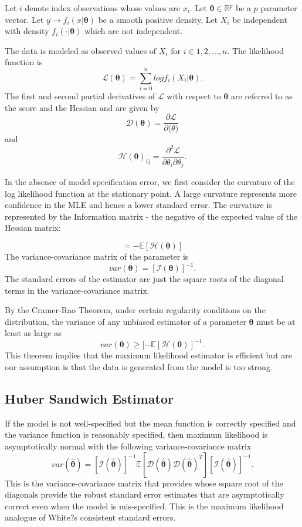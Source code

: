 \documentclass{article}
\newcommand{\be}{\begin{equation}}
\newcommand{\ee}{\end{equation}}
\begin{document}
Let $i$ denote index observations whose values are $x_i$. Let $\mathbf{\theta}\in\mathbb{R}^p$
be a $p$ parameter vector. Let $y\rightarrow f_i(x|\mathbf{\theta})$ be a smooth positive density. Let $X_i$ be independent with density $f_i(\cdot|\mathbf{\theta})$ which are not independent.  

The data is modeled as observed values of $X_i$ for $i\in1,2,\dots,n$. The likelihood function is
\be
\mathcal{L}(\mathbf{\theta})=\sum_{i=0}^n log f_i(X_i | \mathbf{\theta}).
\ee
The first and second partial derivatives of
$\mathcal{L}$
with respect to $\mathbf{\theta}$ are referred to as the score and the Hessian and
are given by
\be
\mathcal{D}(\mathbf{\theta})=\frac{\partial \mathcal{L}}{\partial \mathbf(\theta)}
\ee
and
\be
\mathcal{H}(\mathbf{\theta})_{ij}=\frac{\partial^2 \mathcal{L}}{\partial\theta_i \partial\theta_j}.
\ee




In the absence of model specification error, we first consider the curvature of the log likelihood function at the stationary point. A large curvature represents more confidence in the MLE and hence a lower standard error.  The curvature is represented by the Information matrix - the negative of the
expected value of the Hessian matrix:

\be
[\mathcal{I}(\mathbf{\theta}))] = - \mathbb{E}[\mathcal{H}(\mathbf{\theta})]
\ee
The variance-covariance matrix of the parameter is
 \be
var(\mathbf{\theta}) =  [\mathcal{I}(\mathbf{\theta})]^{-1}.
\ee
The standard errors of the estimator are just the square roots of the
diagonal terms in the variance-covariance matrix.

By the Cramer-Rao Theorem, under certain regularity conditions on the distribution, the variance of any unbiased estimator of a parameter $\mathbf{\theta}$ must be at least as large as
\be
var(\mathbf{\theta})\geq [-\mathbb{E}[\mathcal{H}(\mathbf{\theta})]^{-1}.
\ee
This theorem implies that the maximum likelihood estimator is efficient but are our assumption is that the data is generated from the model is too strong.


\subsection{Huber Sandwich Estimator}

If the model is not well-specified but the mean function is correctly specified and the variance
function is reasonably specified, then maximum likelihood is asymptotically normal with the
following variance-covariance matrix
\be
var(\mathbf{\hat{\theta}})= [\mathcal{I}(\hat{\mathbf{\theta}})]^{-1}\mathbb{E}[\mathcal{D}(\hat{\mathbf{\theta}})\mathcal{D}(\mathbf{\hat{\theta}})^T][\mathcal{I}(\mathbf{\hat{\theta}})]^{-1}.
\ee
This is the variance-covariance matrix that provides whose square root of the diagonals provide the robust standard error estimates that are asymptotically correct even when the model is mis-specified. This is the maximum likelihood analogue of White?s consistent standard errors. 
\end{document}
